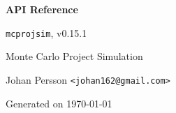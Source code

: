 \documentclass[11pt,a4paper,twoside,openright]{report}
\begin{document}
\begin{titlepage}
  \centering
  \vspace*{2.0cm}
  {\Huge\bfseries\color{brandblue}API Reference\par}
  \vspace{1.2cm}
  {\Large \texttt{mcprojsim}, v0.15.1\par}
  \vspace{1.2cm}
  {\Large Monte Carlo Project Simulation\par}
  \vfill
  {\large Johan Persson \texttt{<johan162@gmail.com>}\par}
  {\large Generated on \today\par}
\end{titlepage}

\tableofcontents
\clearpage

\end{document}
